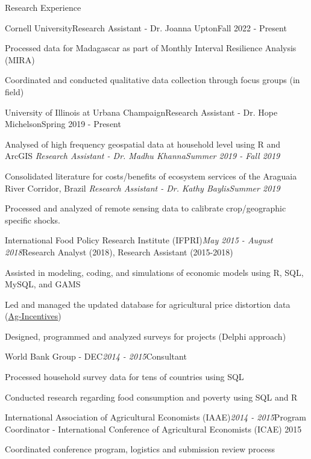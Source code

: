 \documentclass{resume} %
\begin{document}
\begin{rSection}{Research Experience}

\begin{rSubsection}{Cornell University}{}{Research Assistant - Dr. Joanna Upton}{Fall 2022 - Present}
\item Processed data for Madagascar as part of Monthly Interval Resilience Analysis (MIRA)
\item Coordinated and conducted qualitative data collection through focus groups (in field)
\end{rSubsection}

\begin{rSubsection}{University of Illinois at Urbana Champaign}{}{Research Assistant - Dr. Hope Michelson}{Spring 2019 - Present}
\item Analysed of high frequency geospatial data at household level using R and ArcGIS
\vskip 0.02in
\textit{Research Assistant - Dr. Madhu Khanna}\hfill \textit{Summer 2019 - Fall 2019}
\item Consolidated literature for costs/benefits of ecosystem services of the Araguaia River Corridor, Brazil
\vskip 0.02in
\textit{Research Assistant - Dr. Kathy Baylis}\hfill \textit{Summer 2019}
\item Processed and analyzed of remote sensing data to calibrate crop/geographic specific shocks.
\end{rSubsection}

\begin{rSubsection}{International Food Policy Research Institute (IFPRI)}{\textit{May 2015 - August 2018}}{Research Analyst (2018), Research Assistant (2015-2018)}{}
\item Assisted in modeling, coding, and simulations of economic models using R, SQL, MySQL, and GAMS
\item Led and managed the updated database for agricultural price distortion data (\href{http://ag-incentives.org/}{Ag-Incentives})
\item Designed, programmed and analyzed surveys for projects (Delphi approach)
\end{rSubsection}

\begin{rSubsection}{World Bank Group - DEC}{\textit{2014 - 2015}}{Consultant}{}
\item Processed household survey data for tens of countries using SQL
\item Conducted research regarding food consumption and poverty using SQL and R
\end{rSubsection}

\begin{rSubsection}{International Association of Agricultural Economists (IAAE)}{\textit{2014 - 2015}}{Program Coordinator - International Conference of Agricultural Economists (ICAE) 2015}{}
\item Coordinated conference program, logistics and submission review process
\end{rSubsection}

\end{rSection}
\end{document}
